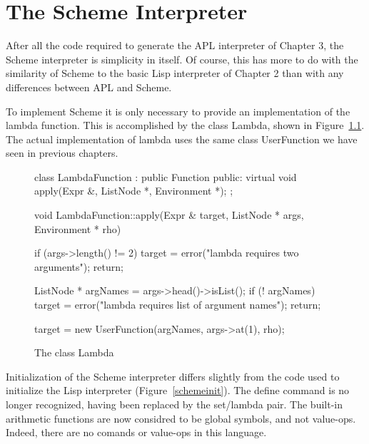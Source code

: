 \chapter{The Scheme Interpreter}

After all the code required to generate the APL interpreter of Chapter 3,
the Scheme interpreter is simplicity in itself.  Of course, this has more
to do with the similarity of Scheme to the basic Lisp interpreter of
Chapter 2 than with any differences between APL and Scheme.

To implement Scheme it is only necessary to provide an implementation of
the lambda function.  This is accomplished by the class {\sf Lambda}, shown
in Figure~\ref{lambda}.  The actual implementation of lambda uses the same
class UserFunction we have seen in previous chapters.

\begin{figure}
\begin{cprog}
class LambdaFunction : public Function {
public:
	virtual void apply(Expr &, ListNode *, Environment *);
};

void LambdaFunction::apply(Expr & target, ListNode * args, Environment * rho)
{
	if (args->length() != 2) {
		target = error("lambda requires two arguments");
		return;
		}

	ListNode * argNames = args->head()->isList();
	if (! argNames) {
		target = error("lambda requires list of argument names");
		return;
		}

	target = new UserFunction(argNames, args->at(1), rho);
}
\end{cprog}
\caption{The class Lambda}\label{lambda}
\end{figure}

Initialization of the Scheme interpreter differs slightly from the code
used to initialize the Lisp interpreter (Figure~\ref{schemeinit}).  The 
{\sf define} command is no longer recognized, having been replaced by the
{\sf set}/{\sf lambda} pair.  The built-in arithmetic functions are now
considred to be global symbols, and not value-ops.  Indeed, there are no
comands or value-ops in this language.

